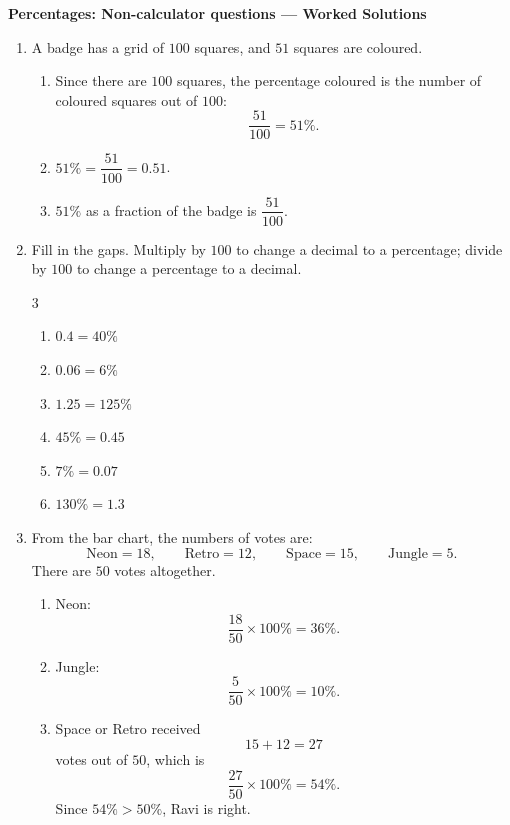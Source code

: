 \documentclass[11pt,a4paper]{article}
\begin{document}
\begin{center}
  {\Large\bfseries Percentages: Non-calculator questions --- Worked Solutions}
\end{center}

\begin{enumerate}

\item A badge has a grid of \(100\) squares, and \(51\) squares are coloured.
\begin{enumerate}
  \item Since there are \(100\) squares, the percentage coloured is the number of coloured squares out of \(100\):
  \[
  \frac{51}{100}=51\%.
  \]
  \item \(51\%=\dfrac{51}{100}=0.51\).
  \item \(51\%\) as a fraction of the badge is \(\dfrac{51}{100}\).
\end{enumerate}

\item Fill in the gaps.  Multiply by \(100\) to change a decimal to a percentage; divide by \(100\) to change a percentage to a decimal.
\begin{multicols}{3}
\begin{enumerate}
  \item \(0.4=40\%\)
  \item \(0.06=6\%\)
  \item \(1.25=125\%\)
  \item \(45\%=0.45\)
  \item \(7\%=0.07\)
  \item \(130\%=1.3\)
\end{enumerate}
\end{multicols}

\item From the bar chart, the numbers of votes are:
\[
\text{Neon}=18,\qquad \text{Retro}=12,\qquad \text{Space}=15,\qquad \text{Jungle}=5.
\]
There are \(50\) votes altogether.
\begin{enumerate}
  \item Neon:
  \[
  \frac{18}{50}\times 100\%=36\%.
  \]
  \item Jungle:
  \[
  \frac{5}{50}\times 100\%=10\%.
  \]
  \item Space or Retro received
  \[
  15+12=27
  \]
  votes out of \(50\), which is
  \[
  \frac{27}{50}\times 100\%=54\%.
  \]
  Since \(54\%>50\%\), Ravi is right.
\end{enumerate}


\end{enumerate}
\end{document}
